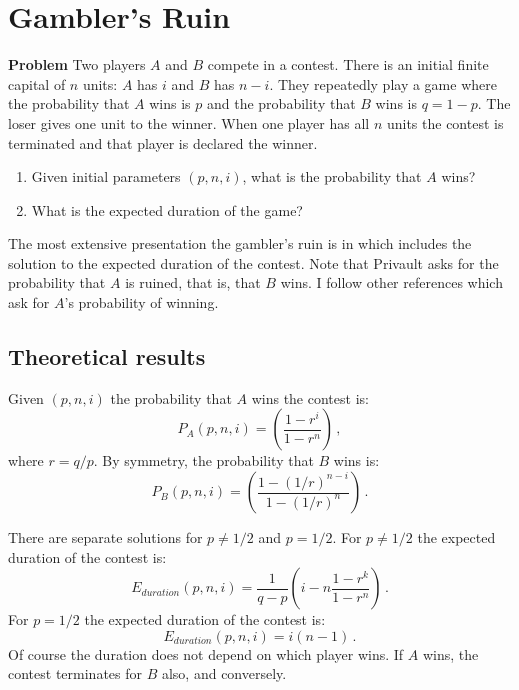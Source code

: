 
\section{Gambler's Ruin}\label{s.gamblers}

\textbf{Problem} Two players $A$ and $B$ compete in a contest. There is an initial finite capital of $n$ units: $A$ has $i$ and $B$ has $n-i$. They repeatedly play a game where the probability that $A$ wins is $p$ and the probability that $B$ wins is $q=1-p$. The loser gives one unit to the winner. When one player has all $n$ units the contest is terminated and that player is declared the winner.
\begin{enumerate}
\item Given initial parameters $(p, n, i)$, what is the probability that $A$ wins?
\item What is the expected duration of the game?
\end{enumerate}
\begin{center}
\end{center}
The most extensive presentation the gambler's ruin is in 
\cite[Chapter~2]{privault} which includes the solution to the expected duration of the contest. Note that Privault asks for the probability that $A$ is ruined, that is, that $B$ wins. I follow other references which ask for $A$'s probability of winning.

\subsection{Theoretical results}

Given $(p,n,i)$ the probability that $A$ wins the contest is:
\[
P_A(p, n, i) = \left(\frac{1-r^{i}}{1-r^n}\right)\,,
\]
where $r=q/p$. By symmetry, the probability that $B$ wins is:
\[
P_B(p, n, i) = \left(\frac{1-(1/r)^{n-i}}{1-(1/r)^{n}}\right)\,.
\]

There are separate solutions for $p\neq 1/2$ and $p=1/2$. For $p\neq 1/2$ the expected duration of the contest is:
\[
E_{\mathit{duration}}(p,n,i)=\frac{1}{q-p}\left(i-n
\frac{1-r^k}{1-r^n}\right)\,.
\]
For $p=1/2$ the expected duration of the contest is:
\[
E_{\mathit{duration}}(p,n,i)=i(n-1)\,.
\]
Of course the duration does not depend on which player wins. If $A$ wins, the contest terminates for $B$ also, and conversely.

